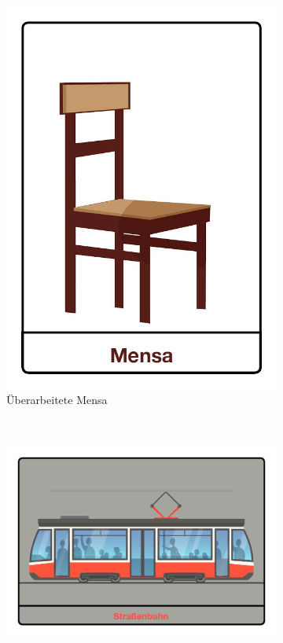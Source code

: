 \begin{figure}[H]
\begin{subfigure}[b]{0.2\textwidth}
        \includegraphics[width=\textwidth]{assets/mensa_new.jpg}
        \caption{Überarbeitete Mensa}
        \label{fig:newMensa}
    \end{subfigure}
    ~
    \begin{subfigure}[b]{0.2\textwidth}
        \includegraphics[width=\textwidth]{assets/tram.png}

\end{subfigure}
\end{figure}
